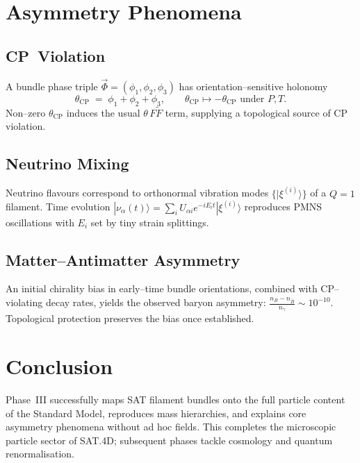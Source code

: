 \documentclass[11pt]{article}
\begin{document}
\section{Asymmetry Phenomena}

\subsection{CP~Violation}
A bundle phase triple $\vec\Phi=(\phi_1,\phi_2,\phi_3)$ has orientation--sensitive
holonomy
\[
\theta_{\text{CP}}\;=\;\phi_1+\phi_2+\phi_3,
\qquad
\theta_{\text{CP}}\mapsto -\theta_{\text{CP}}\text{ under }P,T.
\]
Non--zero $\theta_{\text{CP}}$ induces the usual $\theta\,F\tilde F$ term, supplying
a topological source of CP violation.

\subsection{Neutrino Mixing}
Neutrino flavours correspond to orthonormal vibration modes
$\{|\xi^{(i)}\rangle\}$ of a $Q=1$ filament.
Time evolution
\(
|\nu_\alpha(t)\rangle=\sum_i U_{\alpha i}e^{-iE_it}|\xi^{(i)}\rangle
\)
reproduces PMNS oscillations with $E_i$ set by tiny strain splittings.

\subsection{Matter--Antimatter Asymmetry}
An initial chirality bias in early--time bundle orientations,
combined with CP--violating decay rates, yields the observed baryon
asymmetry:
\(
\frac{n_B-n_{\bar B}}{n_\gamma}\sim10^{-10}.
\)
Topological protection preserves the bias once established.

\section{Conclusion}
Phase~III successfully maps SAT filament bundles onto the full particle
content of the Standard Model, reproduces mass hierarchies, and explains core
asymmetry phenomena without ad hoc fields.  This completes the microscopic
particle sector of SAT.4D; subsequent phases tackle cosmology and quantum
renormalisation.
\end{document}
